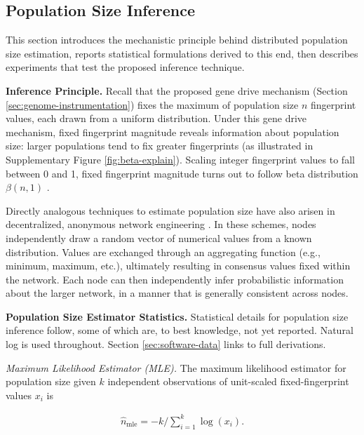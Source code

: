 \subsection{Population Size Inference}
\label{sec:population-size-inference}

This section introduces the mechanistic principle behind distributed population size estimation, reports statistical formulations derived to this end, then describes experiments that test the proposed inference technique.

\textbf{Inference Principle.}
Recall that the proposed gene drive mechanism (Section \ref{sec:genome-instrumentation}) fixes the maximum of population size $n$ fingerprint values, each drawn from a uniform distribution.
Under this gene drive mechanism, fixed fingerprint magnitude reveals information about population size: larger populations tend to fix greater fingerprints (as illustrated in Supplementary Figure \ref{fig:beta-explain}).
Scaling integer fingerprint values to fall between 0 and 1, fixed fingerprint magnitude turns out to follow beta distribution $\beta(n, 1)$ \citep{gentle2009computational}.

Directly analogous techniques to estimate population size have also arisen in decentralized, anonymous network engineering \citep{varagnolo2010distributed,hakan2012distributed}.
In these schemes, nodes independently draw a random vector of numerical values from a known distribution.
Values are exchanged through an aggregating function (e.g., minimum, maximum, etc.), ultimately resulting in consensus values fixed within the network.
Each node can then independently infer probabilistic information about the larger network, in a manner that is generally consistent across nodes.

\textbf{Population Size Estimator Statistics.}
Statistical details for population size inference follow, some of which are, to best knowledge, not yet reported.
Natural log is used throughout.
Section \ref{sec:software-data} links to full derivations.

\textit{Maximum Likelihood Estimator (MLE).}
The maximum likelihood estimator for population size given $k$ independent observations of unit-scaled fixed-fingerprint values $x_i$ is
\begin{footnotesize}
\begin{align} \label{eqn:popsize_mle}
\hat{n}_\mathrm{mle} = -k/\textstyle\sum_{i=1}^k \log( x_i ).
\end{align}
\end{footnotesize}

